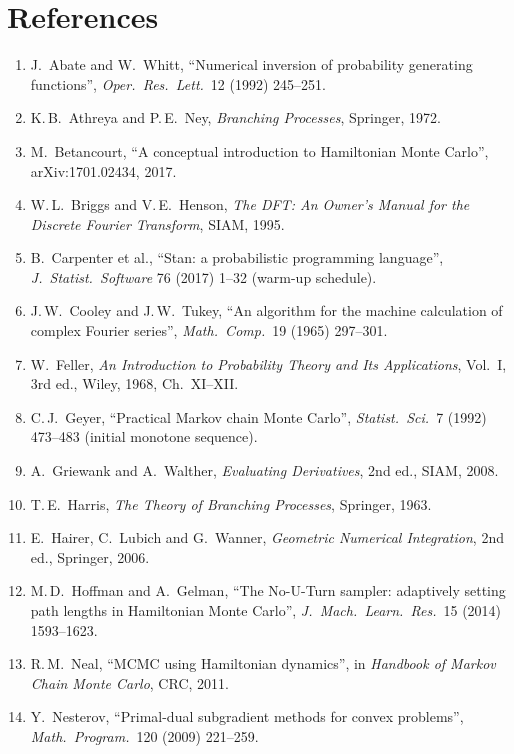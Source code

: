 \documentclass[11pt]{article}
\theoremstyle{definition}
\theoremstyle{remark}
\begin{document}
\section*{References}
\raggedright
\begin{enumerate}\small
\item[{[1]}] J.\ Abate and W.\ Whitt, ``Numerical inversion of probability generating functions'', \emph{Oper.\ Res.\ Lett.}\ 12 (1992) 245--251.
\item[{[2]}] K.\,B.\ Athreya and P.\,E.\ Ney, \emph{Branching Processes}, Springer, 1972.
\item[{[3]}] M.\ Betancourt, ``A conceptual introduction to Hamiltonian Monte Carlo'', arXiv:1701.02434, 2017.
\item[{[4]}] W.\,L.\ Briggs and V.\,E.\ Henson, \emph{The DFT: An Owner's Manual for the Discrete Fourier Transform}, SIAM, 1995.
\item[{[5]}] B.\ Carpenter et al., ``Stan: a probabilistic programming language'', \emph{J.\ Statist.\ Software} 76 (2017) 1--32 (warm-up schedule).
\item[{[6]}] J.\,W.\ Cooley and J.\,W.\ Tukey, ``An algorithm for the machine calculation of complex Fourier series'', \emph{Math.\ Comp.}\ 19 (1965) 297--301.
\item[{[7]}] W.\ Feller, \emph{An Introduction to Probability Theory and Its Applications}, Vol.~I, 3rd ed., Wiley, 1968, Ch.~XI--XII.
\item[{[8]}] C.\,J.\ Geyer, ``Practical Markov chain Monte Carlo'', \emph{Statist.\ Sci.}\ 7 (1992) 473--483 (initial monotone sequence).
\item[{[9]}] A.\ Griewank and A.\ Walther, \emph{Evaluating Derivatives}, 2nd ed., SIAM, 2008.
\item[{[10]}] T.\,E.\ Harris, \emph{The Theory of Branching Processes}, Springer, 1963.
\item[{[11]}] E.\ Hairer, C.\ Lubich and G.\ Wanner, \emph{Geometric Numerical Integration}, 2nd ed., Springer, 2006.
\item[{[12]}] M.\,D.\ Hoffman and A.\ Gelman, ``The No-U-Turn sampler: adaptively setting path lengths in Hamiltonian Monte Carlo'', \emph{J.\ Mach.\ Learn.\ Res.}\ 15 (2014) 1593--1623.
\item[{[13]}] R.\,M.\ Neal, ``MCMC using Hamiltonian dynamics'', in \emph{Handbook of Markov Chain Monte Carlo}, CRC, 2011.
\item[{[14]}] Y.\ Nesterov, ``Primal-dual subgradient methods for convex problems'', \emph{Math.\ Program.}\ 120 (2009) 221--259.

\end{enumerate}
\end{document}
